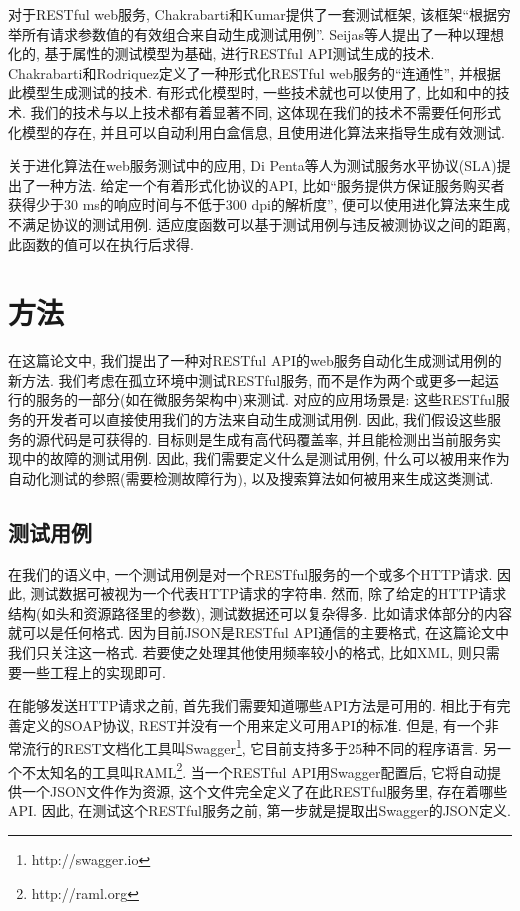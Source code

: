     对于RESTful web服务, Chakrabarti和Kumar提供了一套测试框架, 该框架“根据穷举所有请求参数值的有效组合来自动生成测试用例”.  Seijas等人提出了一种以理想化的, 基于属性的测试模型为基础, 进行RESTful API测试生成的技术. Chakrabarti和Rodriquez定义了一种形式化RESTful web服务的“连通性”, 并根据此模型生成测试的技术. 有形式化模型时, 一些技术就也可以使用了, 比如和中的技术. 我们的技术与以上技术都有着显著不同, 这体现在我们的技术不需要任何形式化模型的存在, 并且可以自动利用白盒信息, 且使用进化算法来指导生成有效测试.
    
    关于进化算法在web服务测试中的应用, Di Penta等人为测试服务水平协议(SLA)提出了一种方法. 给定一个有着形式化协议的API, 比如“服务提供方保证服务购买者获得少于30 ms的响应时间与不低于300 dpi的解析度”, 便可以使用进化算法来生成不满足协议的测试用例. 适应度函数可以基于测试用例与违反被测协议之间的距离, 此函数的值可以在执行后求得. 

\section{方法}

  在这篇论文中, 我们提出了一种对RESTful API的web服务自动化生成测试用例的新方法. 我们考虑在孤立环境中测试RESTful服务, 而不是作为两个或更多一起运行的服务的一部分(如在微服务架构中)来测试. 对应的应用场景是: 这些RESTful服务的开发者可以直接使用我们的方法来自动生成测试用例. 因此, 我们假设这些服务的源代码是可获得的. 目标则是生成有高代码覆盖率, 并且能检测出当前服务实现中的故障的测试用例. 因此, 我们需要定义什么是测试用例, 什么可以被用来作为自动化测试的参照(需要检测故障行为), 以及搜索算法如何被用来生成这类测试. 
    
    \subsection{测试用例}
    在我们的语义中, 一个测试用例是对一个RESTful服务的一个或多个HTTP请求. 因此, 测试数据可被视为一个代表HTTP请求的字符串. 然而, 除了给定的HTTP请求结构(如头和资源路径里的参数), 测试数据还可以复杂得多. 比如请求体部分的内容就可以是任何格式. 因为目前JSON是RESTful API通信的主要格式, 在这篇论文中我们只关注这一格式. 若要使之处理其他使用频率较小的格式, 比如XML, 则只需要一些工程上的实现即可. 
    
    在能够发送HTTP请求之前, 首先我们需要知道哪些API方法是可用的. 相比于有完善定义的SOAP协议, REST并没有一个用来定义可用API的标准. 但是, 有一个非常流行的REST文档化工具叫Swagger\footnote{http://swagger.io}, 它目前支持多于25种不同的程序语言. 另一个不太知名的工具叫RAML\footnote{http://raml.org}. 当一个RESTful API用Swagger配置后, 它将自动提供一个JSON文件作为资源, 这个文件完全定义了在此RESTful服务里, 存在着哪些API. 因此, 在测试这个RESTful服务之前, 第一步就是提取出Swagger的JSON定义. 
    
